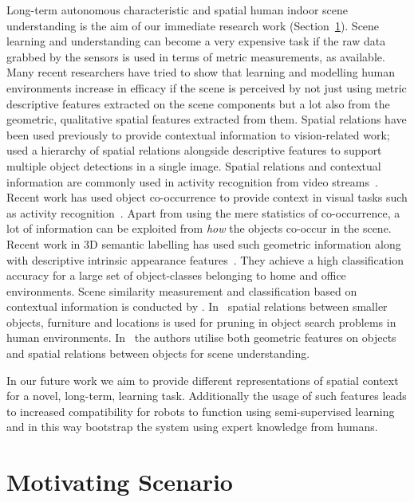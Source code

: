 \documentclass[letterpaper, 10 pt, conference]{ieeeconf}  %
\begin{document}
Long-term autonomous characteristic and spatial human indoor scene understanding is the aim of our immediate research work (Section~\ref{sec:Motivating Scenario}). Scene learning and understanding can become a very expensive task if the raw data grabbed by the sensors is used in terms of metric measurements, as available. Many recent researchers have tried to show that learning and modelling human environments increase in efficacy if the scene is perceived by not just using metric descriptive features extracted on the scene components but a lot also from the geometric, qualitative spatial features extracted from them. Spatial relations have been used previously to provide contextual information to vision-related work;~\cite{MyungJin:CVPR2010} used a hierarchy of spatial relations alongside descriptive features to support multiple object detections in a single image. Spatial relations and contextual information are commonly used in activity recognition from video streams~\cite{Krishna:ECAI2010, Behera2012}. Recent work has used object co-occurrence to provide context in visual tasks such as activity recognition~\cite{Li:2012}. Apart from using the mere statistics of co-occurrence, a lot of information can be exploited from \textit{how} the objects co-occur in the scene. Recent work in 3D semantic labelling has used such geometric information along with descriptive intrinsic appearance features~\cite{Koppula:NIPS2011}. They achieve a high classification accuracy for a large set of object-classes belonging to home and office environments. Scene similarity measurement and classification based on contextual information is conducted by \cite{Fisher:ACMT2011}. In~\cite{Aydemir:ICRA2011} spatial relations between smaller objects, furniture and locations is used for pruning in object search problems in human environments. In~\cite{Southey:2007,kasper:2011} the authors utilise both geometric features on objects and spatial relations between objects for scene understanding.

In our future work we aim to provide different representations of spatial context for a novel, long-term, learning task. Additionally the usage of such features leads to increased compatibility for robots to function using semi-supervised learning and in this way bootstrap the system using expert knowledge from humans.

\section{Motivating Scenario}
\label{sec:Motivating Scenario}
\end{document}
